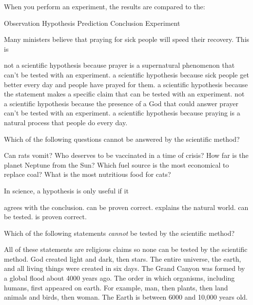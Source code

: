 \question
When you perform an experiment, the results are compared to the:

\begin{choices}
\choice Observation 
\choice Hypothesis
\correctchoice Prediction
\choice Conclusion
\choice Experiment
\end{choices}

\newpage

\question
Many ministers believe that praying for sick people will speed their recovery.  This is

\begin{choices}
\choice not a scientific hypothesis because prayer is a supernatural phenomenon that can't be tested with an experiment.
\choice a scientific hypothesis because sick people get better every day and people have prayed for them.
\correctchoice a scientific hypothesis because the statement makes a specific claim that can be tested with an experiment.
\choice not a scientific hypothesis because the presence of a God that could answer prayer can't be tested with an experiment.
\choice a scientific hypothesis because praying is a natural process that people do every day.
\end{choices}

\question
Which of the following questions cannot be answered by the scientific method?

\begin{choices}
\choice Can rats vomit?
\correctchoice Who deserves to be vaccinated in a time of crisis?
\choice How far is the planet Neptune from the Sun?
\choice Which fuel source is the most economical to replace coal?
\choice What is the most nutritious food for cats?
\end{choices}

\question
In science, a hypothesis is only useful if it

\begin{choices}
\choice agrees with the conclusion.
\choice can be proven correct.
\choice explains the natural world.
\correctchoice can be tested.
\choice is proven correct.
\end{choices}

\question
Which of the following statements \emph{cannot} be tested by the scientific method?

\begin{choices}
\choice All of these statements are religious claims so none can be tested by the scientific method.
\correctchoice God created light and dark, then stars.
\choice The entire universe, the earth, and all living things were created in six days.
\choice The Grand Canyon was formed by a global flood about 4000 years ago.
\choice The order in which organisms, including humans, first appeared on earth. For example, man, then plants, then land animals and birds, then woman.
\choice The Earth is between 6000 and 10,000 years old.
\end{choices}

